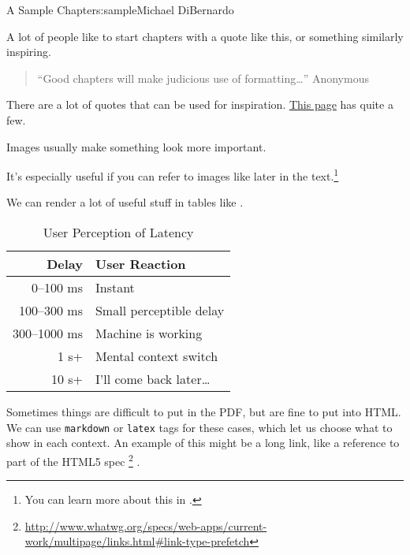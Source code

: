 \begin{aosachapter}{A Sample Chapter}{s:sample}{Michael DiBernardo}

\label{introduction}

A lot of people like to start chapters with a quote like this, or
something similarly inspiring.

\begin{quote}
``Good chapters will make judicious use of formatting\ldots{}''
Anonymous
\end{quote}

There are a lot of quotes that can be used for inspiration.
\href{http://www.brainyquote.com/quotes/keywords/computer_science.html}{This
page} has quite a few.

\label{important}

Images usually make something look more important.


It's especially useful if you can refer to images like
 later in the text.\footnote{You can learn
  more about this in .}

\label{data-stuff}

We can render a lot of useful stuff in tables like
.

\begin{table}
\centering
{\footnotesize
{}
\begin{tabular}{rl}
\hline
\textbf{Delay}
& \textbf{User Reaction}
\\
\hline
0--100 ms
& Instant
\\
100--300 ms
& Small perceptible delay
\\
300--1000 ms
& Machine is working
\\
1 s+
& Mental context switch
\\
10 s+
& I'll come back later{\ldots}
\\
\hline
\end{tabular}
}
\caption{User Perception of Latency}
\label{500l.tbl.tablesample}
\end{table}

Sometimes things are difficult to put in the PDF, but are fine to put
into HTML. We can use \texttt{markdown} or \texttt{latex} tags for these
cases, which let us choose what to show in each context. An example of
this might be a long link, like a reference to part of the HTML5 spec
\footnote{\url{http://www.whatwg.org/specs/web-apps/current-work/multipage/links.html#link-type-prefetch}}
.


\end{aosachapter}

